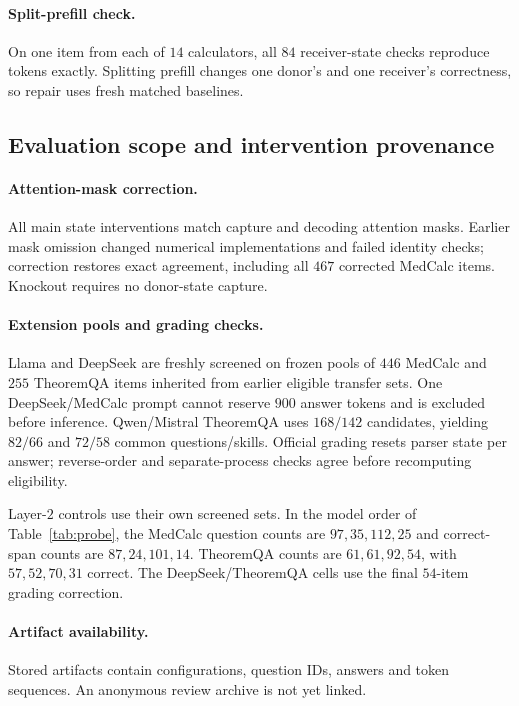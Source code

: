 \paragraph{Split-prefill check.}
On one item from each of $14$ calculators, all $84$ receiver-state checks
reproduce tokens exactly. Splitting prefill changes one donor's and one
receiver's correctness, so repair uses fresh matched baselines.

\subsection{Evaluation scope and intervention provenance}
\label{app:limits}

\paragraph{Attention-mask correction.}
All main state interventions match capture and decoding attention masks.
Earlier mask omission changed numerical implementations and failed identity
checks; correction restores exact agreement, including all $467$ corrected
MedCalc items. Knockout requires no donor-state capture.

\paragraph{Extension pools and grading checks.}
Llama and DeepSeek are freshly screened on frozen pools of $446$ MedCalc
and $255$ TheoremQA items inherited from earlier eligible transfer sets.
One DeepSeek/MedCalc prompt cannot reserve $900$ answer tokens and is
excluded before inference. Qwen/Mistral TheoremQA uses $168/142$
candidates, yielding $82/66$ and $72/58$ common questions/skills.
Official grading resets parser state per answer; reverse-order and
separate-process checks agree before recomputing eligibility.

Layer-$2$ controls use their own screened sets. In the model order of
Table~\ref{tab:probe}, the MedCalc question counts are $97,35,112,25$ and
correct-span counts are $87,24,101,14$. TheoremQA counts are $61,61,92,54$,
with $57,52,70,31$ correct. The DeepSeek/TheoremQA cells use the final
$54$-item grading correction.

\paragraph{Artifact availability.}
Stored artifacts contain configurations, question IDs, answers and token
sequences. An anonymous review archive is not yet linked.



